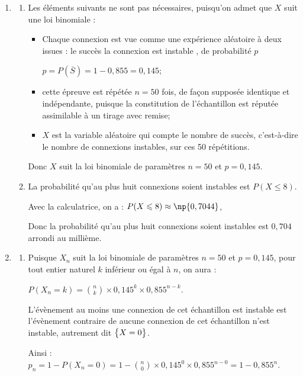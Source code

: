\begin{enumerate}
\item 
	\begin{enumerate}
		\item Les éléments suivants ne sont pas nécessaires, puisqu'on admet que $X$ suit une loi binomiale :

\begin{itemize}
\item Chaque connexion est vue comme une expérience aléatoire à deux issues : le succès \og la connexion est instable \fg{}, de probabilité $p$

$p = P\left(\overline{S}\right) = 1-0,855 = 0,145$;
\item cette épreuve est répétée $n = 50$ fois, de façon supposée identique et indépendante, puisque la constitution de l'échantillon est réputée assimilable à un tirage avec remise;
\item $X$ est la variable aléatoire qui compte le nombre de succès, c'est-à-dire le nombre de connexions instables, sur ces 50 répétitions.
\end{itemize}

Donc $X$ suit la loi binomiale de paramètres $n = 50$ et $p = 0,145$.

		\item La probabilité qu'au plus huit connexions soient instables est $P(X \leqslant 8)$.

Avec la calculatrice, on a : $P(X \leqslant 8) \approx \np{0,7044}$, 

Donc la probabilité qu'au plus huit connexions soient instables est  $0,704$ arrondi au millième.
	\end{enumerate}

\item
	\begin{enumerate}
		\item Puisque $X_n$ suit la loi binomiale de paramètres $n=50$ et $p = 0,145$, pour tout entier naturel $k$ inférieur ou égal à $n$, on aura :

$P(X_n = k) = \displaystyle \binom{n}{k} \times 0,145^k \times 0,855^{n-k}$.

L'évènement \og au moins une connexion de cet échantillon est instable\fg{} est l'évènement contraire de \og aucune connexion de cet échantillon n'est instable\fg{}, autrement dit $\left\{X = 0\strut \right\}$.

Ainsi : $p_n = 1 - P(X_n = 0) = 1 - \displaystyle \binom{n}{0} \times 0,145^0 \times 0,855^{n-0} = 1 - 0,855^n$.


\end{enumerate}
\end{enumerate}
